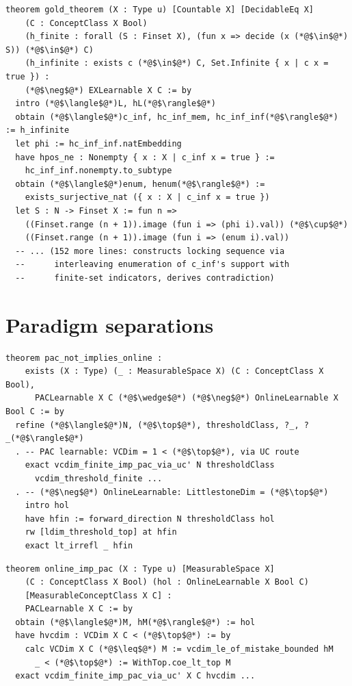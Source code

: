 \begin{lstlisting}[caption={Gold's theorem (Theorem/Gold.lean:19, first 30 lines of 200)}]
theorem gold_theorem (X : Type u) [Countable X] [DecidableEq X]
    (C : ConceptClass X Bool)
    (h_finite : forall (S : Finset X), (fun x => decide (x (*@$\in$@*) S)) (*@$\in$@*) C)
    (h_infinite : exists c (*@$\in$@*) C, Set.Infinite { x | c x = true }) :
    (*@$\neg$@*) EXLearnable X C := by
  intro (*@$\langle$@*)L, hL(*@$\rangle$@*)
  obtain (*@$\langle$@*)c_inf, hc_inf_mem, hc_inf_inf(*@$\rangle$@*) := h_infinite
  let phi := hc_inf_inf.natEmbedding
  have hpos_ne : Nonempty { x : X | c_inf x = true } :=
    hc_inf_inf.nonempty.to_subtype
  obtain (*@$\langle$@*)enum, henum(*@$\rangle$@*) :=
    exists_surjective_nat ({ x : X | c_inf x = true })
  let S : N -> Finset X := fun n =>
    ((Finset.range (n + 1)).image (fun i => (phi i).val)) (*@$\cup$@*)
    ((Finset.range (n + 1)).image (fun i => (enum i).val))
  -- ... (152 more lines: constructs locking sequence via
  --      interleaving enumeration of c_inf's support with
  --      finite-set indicators, derives contradiction)
\end{lstlisting}

\section{Paradigm separations}

\begin{lstlisting}[caption={PAC does not imply Online (Theorem/Separation.lean:1175)}]
theorem pac_not_implies_online :
    exists (X : Type) (_ : MeasurableSpace X) (C : ConceptClass X Bool),
      PACLearnable X C (*@$\wedge$@*) (*@$\neg$@*) OnlineLearnable X Bool C := by
  refine (*@$\langle$@*)N, (*@$\top$@*), thresholdClass, ?_, ?_(*@$\rangle$@*)
  . -- PAC learnable: VCDim = 1 < (*@$\top$@*), via UC route
    exact vcdim_finite_imp_pac_via_uc' N thresholdClass
      vcdim_threshold_finite ...
  . -- (*@$\neg$@*) OnlineLearnable: LittlestoneDim = (*@$\top$@*)
    intro hol
    have hfin := forward_direction N thresholdClass hol
    rw [ldim_threshold_top] at hfin
    exact lt_irrefl _ hfin
\end{lstlisting}

\begin{lstlisting}[caption={Online implies PAC (Theorem/Separation.lean:132)}]
theorem online_imp_pac (X : Type u) [MeasurableSpace X]
    (C : ConceptClass X Bool) (hol : OnlineLearnable X Bool C)
    [MeasurableConceptClass X C] :
    PACLearnable X C := by
  obtain (*@$\langle$@*)M, hM(*@$\rangle$@*) := hol
  have hvcdim : VCDim X C < (*@$\top$@*) := by
    calc VCDim X C (*@$\leq$@*) M := vcdim_le_of_mistake_bounded hM
      _ < (*@$\top$@*) := WithTop.coe_lt_top M
  exact vcdim_finite_imp_pac_via_uc' X C hvcdim ...
\end{lstlisting}

